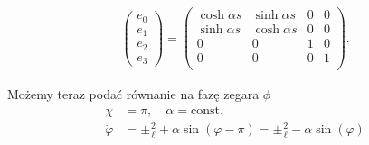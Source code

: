 \begin{align}\label{EHiper}
\begin{pmatrix}
e_0\\
e_1\\
e_2\\
e_3
\end{pmatrix}
=
\begin{pmatrix}
\cosh \alpha s & \sinh \alpha s & 0 &   0 \\
\sinh \alpha s & \cosh \alpha s & 0 &   0 \\
0 & 0 & 1 &   0 \\
0 & 0 & 0 &   1 \\
\end{pmatrix}.
\end{align}

Możemy teraz podać równanie na fazę zegara $\phi$ 
\begin{align*}
\chi &= \pi, \quad \alpha = \text{const.} \\
\dot{\varphi} &= \pm \frac{2}{\ell} + \alpha \sin ( \varphi - \pi )
 = \pm \frac{2}{\ell} -  \alpha \sin ( \varphi )
\end{align*}
